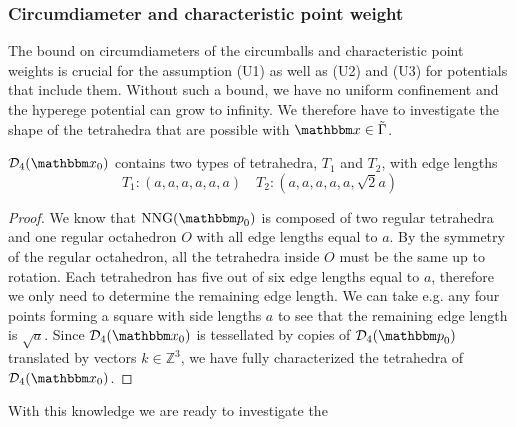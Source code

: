\begin{remark}
\subsubsection{Circumdiameter and characteristic point weight}
The bound on circumdiameters of the circumballs and characteristic point weights is crucial for the assumption (U1) as well as (U2) and (U3) for potentials that include them. Without such a bound, we have no uniform confinement and the hyperege potential can grow to infinity. We therefore have to investigate the shape of the tetrahedra that are possible with $\x \in \tilde\Gamma$. 

\begin{proposition} $\mathcal D_4(\x_0)$ contains two types of tetrahedra, $T_1$ and $T_2$, with edge lengths
$$T_1: (a,a,a,a,a,a) \quad T_2:(a,a,a,a,a,\sqrt 2a)$$
\end{proposition}
\begin{proof}
We know that $\text{NNG}(\p_0)$ is composed of two regular tetrahedra and one regular octahedron $O$ with all edge lengths equal to $a$. By the symmetry of the regular octahedron, all the tetrahedra inside $O$ must be the same up to rotation. Each tetrahedron has five out of six edge lengths equal to $a$, therefore we only need to determine the remaining edge length. We can take e.g. any four points forming a square with side lengths $a$ to see that the remaining edge length is $\sqrt a$.
Since $\mathcal D_4(\x_0)$ is tessellated by copies of $\mathcal D_4(\p_0)$ translated by vectors $k\in\mathbb Z^3$, we have fully characterized the tetrahedra of $\mathcal D_4(\x_0)$. 
\end{proof}

With this knowledge we are ready to investigate the 











\end{remark}

